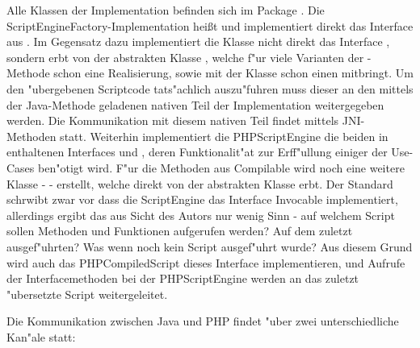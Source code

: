 Alle Klassen der Implementation befinden sich im Package . 
Die ScriptEngineFactory-Implementation hei\ss t  und implementiert direkt das Interface 
 aus . Im Gegensatz dazu implementiert die Klasse  nicht
direkt das Interface , sondern erbt von der abstrakten Klasse , welche f"ur
viele Varianten der -Methode schon eine Realisierung, sowie mit der Klasse  schon einen 
 mitbringt. Um den "ubergebenen Scriptcode tats"achlich auszu"fuhren muss dieser an den mittels der Java-Methode
 geladenen nativen Teil der Implementation weitergegeben werden. Die Kommunikation mit diesem
nativen Teil findet mittels JNI-Methoden statt.
Weiterhin implementiert die PHPScriptEngine die beiden in  enthaltenen Interfaces  und
, deren Funktionalit"at zur Erff"ullung einiger der Use-Cases ben"otigt wird. F"ur die Methoden aus
Compilable wird noch eine weitere Klasse -  - erstellt, welche direkt von der abstrakten
Klasse  erbt.
Der Standard schrwibt zwar vor dass die ScriptEngine das Interface Invocable implementiert, allerdings ergibt das aus Sicht
des Autors nur wenig Sinn - auf welchem Script sollen Methoden und Funktionen aufgerufen werden? Auf dem zuletzt ausgef"uhrten?
Was wenn noch kein Script ausgef"uhrt wurde? Aus diesem Grund wird auch das PHPCompiledScript dieses Interface implementieren,
und Aufrufe der Interfacemethoden bei der PHPScriptEngine werden an das zuletzt "ubersetzte Script weitergeleitet.

Die Kommunikation zwischen Java und PHP findet "uber zwei unterschiedliche Kan"ale statt:

